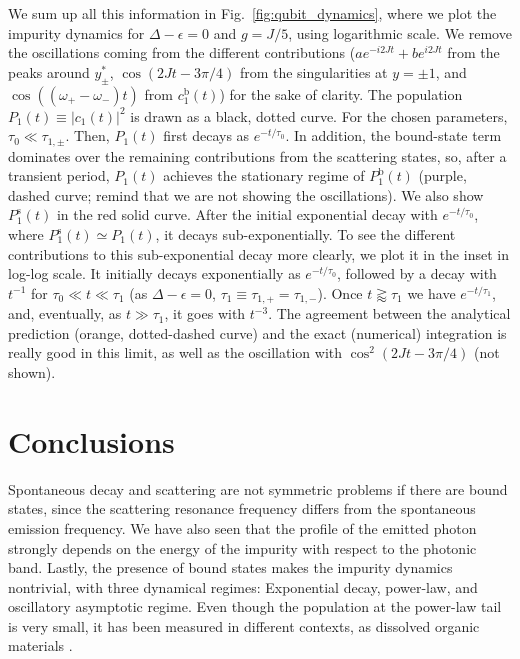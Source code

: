 \documentclass[aps,pra,twocolumn,floatfix,superscriptaddress]{revtex4-1}%
\begin{document}
{\color{blue}We sum up all this information in Fig.\ \ref{fig:qubit_dynamics}, where we plot the impurity dynamics for $\Delta-\epsilon=0$ and $g=J/5$, using logarithmic scale. 
We remove the oscillations coming from the different contributions ($ae^{-i2Jt}+be^{i2Jt}$ from the peaks around $y_\pm^*$, $\cos(2Jt-3\pi/4)$ from the singularities at $y=\pm 1$, and $\cos((\omega_+-\omega_-)t)$ from $c_1^\text{b}(t)$) for the sake of clarity. The population $P_1(t)\equiv|c_1(t)|^2$ is drawn as a black, dotted curve. For the chosen parameters, $\tau_0\ll \tau_{1,\pm}$. Then, $P_1(t)$ first decays as $e^{-t/\tau_0}$. In addition, the bound-state term dominates over the remaining contributions from the scattering states, so, after a transient period, $P_1(t)$ achieves the stationary regime of $P_1^\text{b}(t)$ (purple, dashed curve; remind that we are not showing the oscillations). We also show $P_1^\text{s}(t)$ in the red solid curve. After the initial exponential decay with $e^{-t/\tau_0}$, where $P_1^\text{s}(t)\simeq P_1(t)$, it decays sub-exponentially. To see the different contributions to this sub-exponential decay more clearly, we plot it in the inset in log-log scale. It initially decays exponentially as $e^{-t/\tau_0}$, followed by a decay with $t^{-1}$ for $\tau_0\ll t\ll \tau_1$ (as $\Delta-\epsilon=0$, $\tau_1\equiv\tau_{1,+}=\tau_{1,-}$). Once $t\gtrapprox \tau_1$ we have $e^{-t/\tau_1}$, and, eventually, as $t\gg\tau_1$, it goes with $t^{-3}$. The agreement between the analytical prediction (orange, dotted-dashed curve) and the exact (numerical) integration is really good in this limit, as well as the oscillation with $\cos^2(2Jt-3\pi/4)$ (not shown).}

\section{Conclusions}\label{sec:conclusions}

{\color{blue}Spontaneous decay and scattering are not symmetric problems if there are bound states, since the scattering resonance frequency differs from the spontaneous emission frequency. We have also seen that the profile of the emitted photon strongly depends on the energy of the impurity with respect to the photonic band. Lastly, the presence of bound states makes the impurity dynamics nontrivial, with three dynamical regimes: Exponential decay, power-law, and oscillatory asymptotic regime. Even though the population at the power-law tail is very small, it has been measured in different contexts, as dissolved organic materials \cite{Rothe2006}}.
\end{document}
